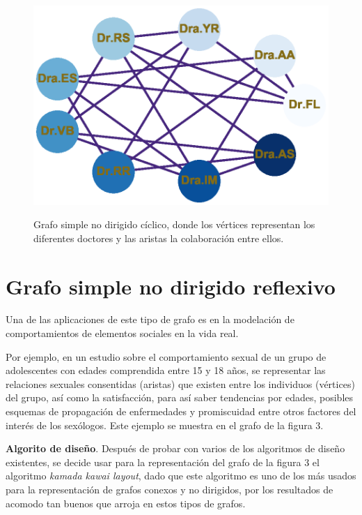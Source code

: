 \documentclass{article}
\begin{document}
    
\begin{center}

\end{center}
\begin{figure}[h]
\begin{center}
\includegraphics[scale=0.7]{Graf2_circular_layout.eps}\\
\caption{Grafo simple no dirigido cíclico, donde los vértices representan los diferentes doctores y las aristas la colaboración entre ellos.}
\end{center}

\end{figure}

\newpage
\section{Grafo simple no dirigido reflexivo}
Una de las aplicaciones de este tipo de grafo es en la modelación de comportamientos de elementos sociales en la vida real.

Por ejemplo, en un estudio sobre el comportamiento sexual de un grupo de adolescentes con edades comprendida entre 15 y 18 años, se representar las relaciones sexuales consentidas (aristas) que existen entre los individuos (vértices) del grupo, así como la satisfacción, para así saber tendencias por edades, posibles esquemas de propagación de enfermedades y promiscuidad entre otros factores del interés de los sexólogos. Este ejemplo se muestra en el grafo de la figura 3.

\textbf{Algorito de diseño}.
Después de probar con varios de los algoritmos de diseño existentes, se decide usar para la representación del grafo de la figura 3 el algoritmo \textit{kamada kawai layout}, dado que este algoritmo es uno de los más usados para la representación de grafos conexos y no dirigidos, por los resultados de acomodo tan buenos que arroja en estos tipos de grafos.
\end{document}
